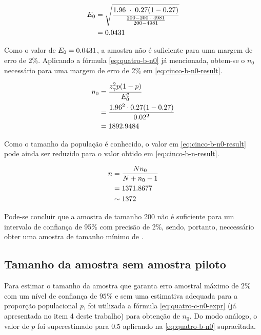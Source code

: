 \begin{align}
	\label{eq:cinco-b-e0-calc}
	E_0 &= \sqrt{\frac{1.96 \;\cdot\; 0.27 (1 - 0.27) }{\frac{200 - 200 \;\cdot\; 4981}{200 - 4981}}} \nonumber \\
	    &= 0.0431 \nonumber
\end{align}

Como o valor de $E_0 = 0.0431$, a amostra não é suficiente para uma margem de erro de 2\%. Aplicando a fórmula \eqref{eq:quatro-b-n0} já mencionada, obtem-se o $n_0$ necessário para uma margem de erro de 2\% em \eqref{eq:cinco-b-n0-result}.

\begin{align}
	n_0 &= \frac{z_\gamma^2 p(1-p)}{E_0^2} \nonumber \\
	    &= \frac{1.96^2 \cdot 0.27(1-0.27)}{0.02^2} \nonumber \\
	    &= \label{eq:cinco-b-n0-result}
	       1892.9484	
\end{align}

Como o tamanho da população é conhecido, o valor em \eqref{eq:cinco-b-n0-result} pode ainda ser reduzido para o valor obtido em \eqref{eq:cinco-b-n-result}.

\begin{align}
	n &= \frac{N n_0}{N + n_0 - 1} \nonumber \\
    &= 1371.8677 \nonumber \\
	  &\sim \label{eq:cinco-b-n-result} 
	     1372
\end{align}

Pode-se concluir que a amostra de tamanho 200 não é suficiente para um intervalo de confiança de 95\% com precisão de 2\%, sendo, portanto, neccessário obter uma amostra de tamanho mínimo de \CINCOBnceil.


\subsection{Tamanho da amostra sem amostra piloto}

Para estimar o tamanho da amostra que garanta erro amostral máximo de $2\%$ com um nível de confiança de $95\%$ e sem uma estimativa adequada para a proporção populacional $p$, foi utilizada a fórmula \eqref{eq:quatro-c-n0-expr} (já apresentada no item 4 deste trabalho) para obtenção de $n_0$. 
Do modo análogo, o valor de $p$ foi superestimado para $0.5$ aplicando na \autoref{eq:quatro-b-n0} supracitada.

